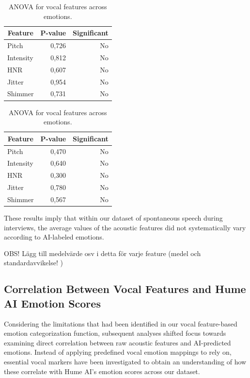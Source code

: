 \begin{table}[H]
    \centering 
    \begin{subtable}[b]{0.48\textwidth}
        \centering
        \caption*{\textbf{Positive recordings}}
        \begin{tabular}{lrr}
        \toprule
        \multicolumn{1}{c}{\textbf{Feature}} & \textbf{P-value} & \textbf{Significant} \\
        \midrule
        Pitch      & 0,726 & No \\
        Intensity  & 0,812 & No \\
        HNR        & 0,607 & No \\
        Jitter     & 0,954 & No \\
        Shimmer    & 0,731 & No \\
        \bottomrule
        \end{tabular}
        \caption{ANOVA: Positive recordings.}
        \label{tab:rq1_anova_pos}
    \end{subtable}
    \hfill
    \begin{subtable}[b]{0.48\textwidth}
        \centering
        \caption*{\textbf{Negative recordings}}
        \begin{tabular}{lrr}
        \toprule
        \multicolumn{1}{c}{\textbf{Feature}} & \textbf{P-value} & \textbf{Significant} \\
        \midrule
        Pitch      & 0,470 & No \\
        Intensity  & 0,640 & No \\
        HNR        & 0,300 & No \\
        Jitter     & 0,780 & No \\
        Shimmer    & 0,567 & No \\
        \bottomrule
        \end{tabular}
        \caption{ANOVA: Negative recordings.}
        \label{tab:rq1_anova_neg}
    \end{subtable}
    \caption{ANOVA for vocal features across emotions.}
    \label{tab:rq1_anova_all}
\end{table}  
  
These results imply that within our dataset of spontaneous speech during interviews, the average values of the acoustic features did not systematically vary according to AI-labeled emotions. 

OBS! Lägg till medelvärde osv i detta för varje feature (medel och standardavvikelse! )

\subsection{Correlation Between Vocal Features and Hume AI Emotion Scores}
Considering the limitations that had been identified in our vocal feature-based emotion categorization function, subsequent analyses shifted focus towards examining direct correlation between raw acoustic features and AI-predicted emotions. Instead of applying predefined vocal emotion mappings to rely on, essential vocal markers have been investigated to obtain an understanding of how these correlate with Hume AI’s emotion scores across our dataset. 

